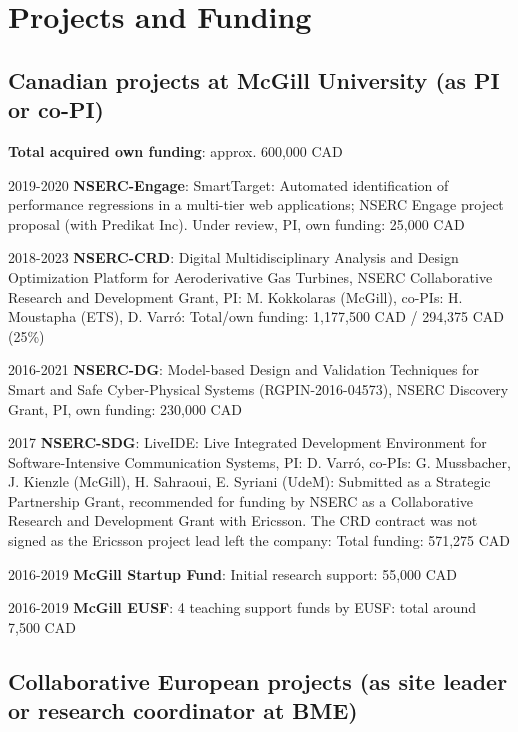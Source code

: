 \newpage 

\section{Projects and Funding} 


\subsection{Canadian projects at McGill University (as PI or co-PI)}
\textbf{Total acquired own funding}: approx. 600,000 CAD 

\begin{yearlist}
\item[2019-2020] \textbf{NSERC-Engage}: SmartTarget: Automated identification of performance regressions in a multi-tier web applications; NSERC Engage project proposal (with Predikat Inc). Under review, PI, own funding: 25,000 CAD 
\item[2018-2023] \textbf{NSERC-CRD}: Digital Multidisciplinary Analysis and Design Optimization Platform for Aeroderivative Gas Turbines, NSERC Collaborative Research and Development Grant, PI: M. Kokkolaras (McGill), co-PIs: H. Moustapha (ETS), 
D. Varr\'o:  Total/own funding: 1,177,500 CAD / 294,375 CAD (25\%)
\item[2016-2021] \textbf{NSERC-DG}: Model-based Design and Validation Techniques for
Smart and Safe Cyber-Physical Systems (RGPIN-2016-04573), NSERC Discovery Grant, PI, own funding: 230,000 CAD 
\item[2017] \textbf{NSERC-SDG}: LiveIDE: Live Integrated Development Environment for Software-Intensive Communication Systems, PI: D. Varr\'o, co-PIs: G. Mussbacher, J. Kienzle (McGill), H. Sahraoui, E. Syriani (UdeM): Submitted as a Strategic Partnership Grant, recommended for funding by NSERC as a Collaborative Research and Development Grant with Ericsson. The CRD contract was not signed as the Ericsson project lead left the company: Total funding: 571,275 CAD
\item[2016-2019] \textbf{McGill Startup Fund}: Initial research support: 55,000 CAD 
\item[2016-2019] \textbf{McGill EUSF}: 4 teaching support funds by EUSF: total around 7,500 CAD 
\end{yearlist}


\subsection{Collaborative European projects (as site leader or research coordinator at BME)}

